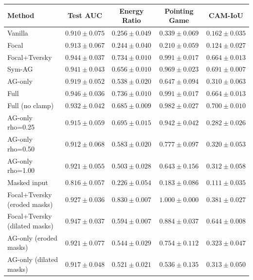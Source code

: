 \begin{tabular}{l c c c c}
\toprule
\textbf{Method} & \textbf{Test AUC} & \textbf{Energy Ratio} & \textbf{Pointing Game} & \textbf{CAM-IoU} \\
\midrule
Vanilla & $0.910 \pm 0.075$ & $0.256 \pm 0.049$ & $0.339 \pm 0.069$ & $0.162 \pm 0.035$ \\
Focal & $0.913 \pm 0.067$ & $0.244 \pm 0.040$ & $0.210 \pm 0.059$ & $0.124 \pm 0.027$ \\
Focal+Tversky & $0.944 \pm 0.037$ & $0.734 \pm 0.010$ & $0.991 \pm 0.017$ & $0.664 \pm 0.013$ \\
Sym-AG & $0.941 \pm 0.043$ & $0.656 \pm 0.010$ & $0.969 \pm 0.023$ & $0.691 \pm 0.007$ \\
AG-only & $0.919 \pm 0.052$ & $0.538 \pm 0.020$ & $0.647 \pm 0.094$ & $0.310 \pm 0.063$ \\
Full & $0.946 \pm 0.036$ & $0.736 \pm 0.010$ & $0.991 \pm 0.017$ & $0.664 \pm 0.013$ \\
Full (no clamp) & $0.932 \pm 0.042$ & $0.685 \pm 0.009$ & $0.982 \pm 0.027$ & $0.700 \pm 0.010$ \\
AG-only rho=0.25 & $0.915 \pm 0.059$ & $0.695 \pm 0.015$ & $0.942 \pm 0.042$ & $0.282 \pm 0.026$ \\
AG-only rho=0.50 & $0.912 \pm 0.068$ & $0.583 \pm 0.020$ & $0.777 \pm 0.097$ & $0.320 \pm 0.053$ \\
AG-only rho=1.00 & $0.921 \pm 0.055$ & $0.503 \pm 0.028$ & $0.643 \pm 0.156$ & $0.312 \pm 0.058$ \\
Masked input & $0.816 \pm 0.057$ & $0.226 \pm 0.054$ & $0.183 \pm 0.086$ & $0.111 \pm 0.035$ \\
Focal+Tversky (eroded masks) & $0.927 \pm 0.036$ & $0.830 \pm 0.007$ & $1.000 \pm 0.000$ & $0.381 \pm 0.027$ \\
Focal+Tversky (dilated masks) & $0.947 \pm 0.037$ & $0.594 \pm 0.007$ & $0.884 \pm 0.037$ & $0.644 \pm 0.008$ \\
AG-only (eroded masks) & $0.921 \pm 0.077$ & $0.544 \pm 0.029$ & $0.754 \pm 0.112$ & $0.323 \pm 0.047$ \\
AG-only (dilated masks) & $0.917 \pm 0.048$ & $0.521 \pm 0.021$ & $0.536 \pm 0.135$ & $0.313 \pm 0.050$ \\
\bottomrule
\end{tabular}

